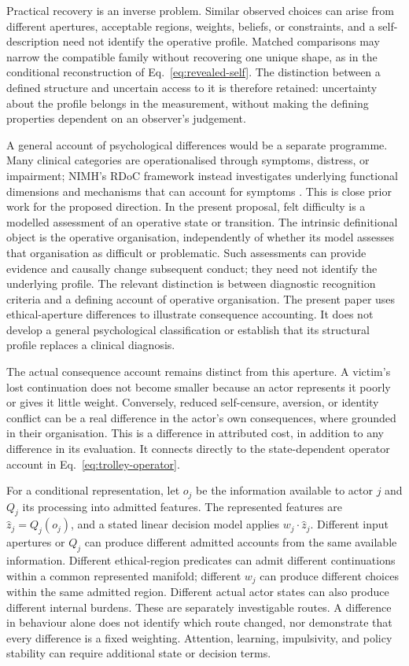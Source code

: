 \documentclass[11pt,a4paper]{article}
\theoremstyle{remark}
\begin{document}
Practical recovery is an inverse problem. Similar observed choices can arise
from different apertures, acceptable regions, weights, beliefs, or constraints,
and a self-description need not identify the operative profile. Matched
comparisons may narrow the compatible family without recovering one unique
shape, as in the conditional reconstruction of Eq.~\eqref{eq:revealed-self}.
The distinction between a defined structure and uncertain access to it is
therefore retained: uncertainty about the profile belongs in the measurement,
without making the defining properties dependent on an observer's judgement.

A general account of psychological differences would be a separate programme.
Many clinical categories are operationalised through symptoms, distress, or
impairment; NIMH's RDoC framework instead investigates underlying functional
dimensions and mechanisms that can account for symptoms \citep{nimhrdoc}.
This is close prior work for the proposed direction. In the present proposal,
felt difficulty is a modelled assessment of an operative state or transition.
The intrinsic definitional object is the operative organisation, independently
of whether its model assesses that organisation as difficult or problematic.
Such assessments can provide evidence and causally change subsequent conduct;
they need not identify the underlying profile. The relevant distinction is
between diagnostic recognition criteria and a defining account of operative
organisation. The present paper
uses ethical-aperture differences to illustrate consequence accounting. It does
not develop a general psychological classification or establish that its
structural profile replaces a clinical diagnosis.

The actual consequence account remains distinct from this aperture. A victim's
lost continuation does not become smaller because an actor represents it poorly
or gives it little weight. Conversely, reduced self-censure, aversion, or
identity conflict can be a real difference in the actor's own consequences,
where grounded in their organisation. This is a difference in attributed cost,
in addition to any difference in its evaluation. It connects directly to the
state-dependent operator account in Eq.~\eqref{eq:trolley-operator}.

For a conditional representation, let $o_j$ be the information available to
actor $j$ and $Q_j$ its processing into admitted features. The represented
features are $\widehat z_j=Q_j(o_j)$, and a stated linear decision model applies
$w_j\cdot\widehat z_j$. Different input apertures or $Q_j$ can produce different admitted accounts
from the same available information. Different ethical-region predicates can
admit different continuations within a common represented manifold; different
$w_j$ can produce different choices within the same admitted region. Different actual actor states can also
produce different internal burdens. These are separately investigable routes.
A difference in behaviour alone does not identify which route changed, nor
demonstrate that every difference is a fixed weighting. Attention, learning,
impulsivity, and policy stability can require additional state or decision terms.
\end{document}
